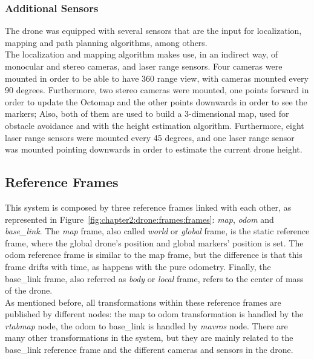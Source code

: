 \subsubsection{Additional Sensors}
The drone was equipped with several sensors that are the input for localization, mapping and path planning algorithms, among others.\\

The localization and mapping algorithm makes use, in an indirect way, of monocular and stereo cameras, and laser range sensors. Four cameras were mounted in order to be able to have 360 range view, with cameras mounted every 90 degrees. Furthermore, two stereo cameras were mounted, one points forward in order to update the Octomap and the other points downwards in order to see the markers; Also, both of them are used to build a 3-dimensional map, used for obstacle avoidance and with the height estimation algorithm. Furthermore, eight laser range sensors were mounted every 45 degrees, and one laser range sensor was mounted pointing downwards in order to estimate the current drone height.\\

\subsection{Reference Frames}
\label{subsec:chapter2:drone:frames}
This system is composed by three reference frames linked with each other, as represented in Figure~\ref{fig:chapter2:drone:frames:frames}: \emph{map}, \emph{odom} and \emph{base\_link}. The \emph{map} frame, also called \emph{world} or \emph{global} frame, is the static reference frame, where the global drone's position and global markers' position is set. The odom reference frame is similar to the map frame, but the difference is that this frame drifts with time, as happens with the pure odometry. Finally, the base\_link frame, also referred as \emph{body} or \emph{local} frame, refers to the center of mass of the drone.\\

As mentioned before, all transformations within these reference frames are published by different nodes: the map to odom transformation is handled by the \emph{rtabmap} node, the odom to base\_link is handled by \emph{mavros} node. There are many other transformations in the system, but they are mainly related to the base\_link reference frame and the different cameras and sensors in the drone. \\

